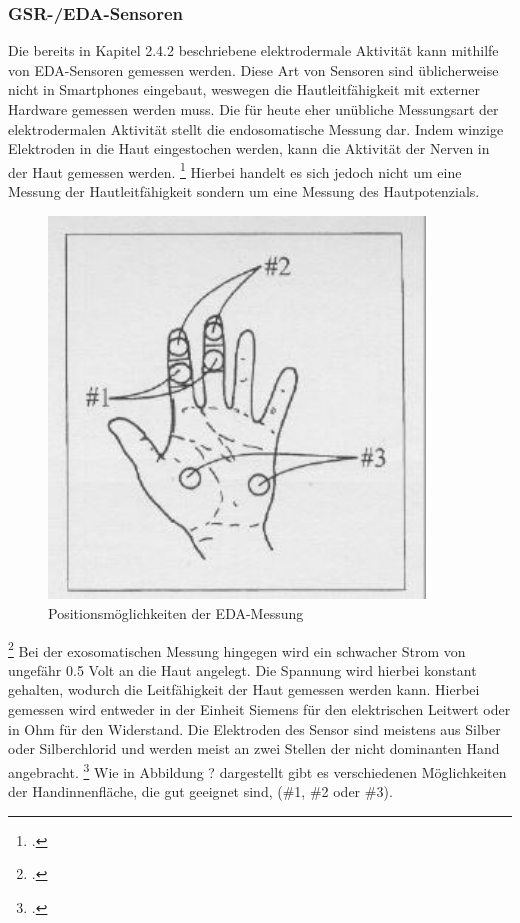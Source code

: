 \subsubsection{GSR-/EDA-Sensoren}
Die bereits in Kapitel 2.4.2 beschriebene elektrodermale Aktivität kann mithilfe von EDA-Sensoren gemessen werden. Diese Art von Sensoren sind üblicherweise nicht in Smartphones eingebaut, weswegen die Hautleitfähigkeit mit externer Hardware gemessen werden muss. \newline
Die für heute eher unübliche Messungsart der elektrodermalen Aktivität stellt die endosomatische Messung dar. Indem winzige Elektroden in die Haut eingestochen werden, kann die Aktivität der Nerven in der Haut gemessen werden. \footcite[Vgl.][Folie 25]{Sch12} Hierbei handelt es sich jedoch nicht um eine Messung der Hautleitfähigkeit sondern um eine Messung des Hautpotenzials. \newline
\begin{figure}[h]
	\centering
	\includegraphics[width=10cm]{Bilder/gsr-hand.jpg}
	\caption[Positionsmöglichkeiten der EDA-Messung]{Positionsmöglichkeiten der EDA-Messung\footnotemark}
\end{figure}\footcitetext[][Folie 25]{Sch12}
\newline
Bei der exosomatischen Messung hingegen wird ein schwacher Strom von ungefähr 0.5 Volt an die Haut angelegt. Die Spannung wird hierbei konstant gehalten, wodurch die Leitfähigkeit der Haut gemessen werden kann. Hierbei gemessen wird entweder in der Einheit Siemens für den elektrischen Leitwert oder in Ohm für den Widerstand. Die Elektroden des Sensor sind meistens aus Silber oder Silberchlorid und werden meist an zwei Stellen der nicht dominanten Hand angebracht. \footcite[Vgl.][Folie 25]{Sch12} Wie in Abbildung ? dargestellt gibt es verschiedenen Möglichkeiten der Handinnenfläche, die gut geeignet sind, (\#1, \#2 oder \#3). \newline
